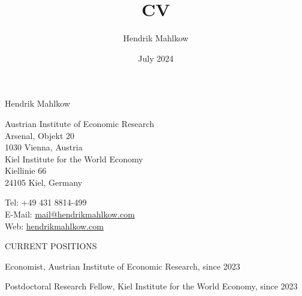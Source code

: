 \documentclass{article}
\title{CV}
\author{Hendrik Mahlkow}
\date{July 2024}
\begin{document}
{\selectfont 
	    \LARGE{Hendrik Mahlkow}
	}\\
\bigskip


\begin{minipage}[t]{0.66\textwidth}
    Austrian Institute of Economic Research \\
    Arsenal, Objekt 20 \\
    1030 Vienna, Austria \\
    \newline
    Kiel Institute for the World Economy \\
    Kiellinie 66 \\
    24105 Kiel, Germany
\end{minipage}
\hfill
\begin{minipage}[t]{0.33\textwidth} 
    Tel: +49 431 8814-499 \\
    E-Mail: \href{mailto:mail@hendrikmahlkow.com}{mail@hendrikmahlkow.com} \\
    Web: \href{http://hendrikmahlkow.com}{hendrikmahlkow.com} 
\end{minipage}
\bigskip
\bigskip


\begin{comment}
\begin{minipage}[t]{0.12\textwidth}
    {\fontfamily{phv}\selectfont ACADEMIC POSITION} \\
\end{minipage}
\hspace{5mm}
\begin{minipage}[t]{0.8\textwidth} 
    Researcher, Kiel Institute for the World Economy, since July 2019
\end{minipage}
\medskip
\end{comment}

\begin{minipage}[t]{0.12\textwidth}
    {\selectfont CURRENT POSITIONS} \\
\end{minipage}
\hspace{5mm}
\begin{minipage}[t]{0.8\textwidth} 
    Economist, Austrian Institute of Economic Research,  since 2023 \par
    Postdoctoral Research Fellow, Kiel Institute for the World Economy,  since 2023 \par
\end{minipage}
\medskip
\end{document}
